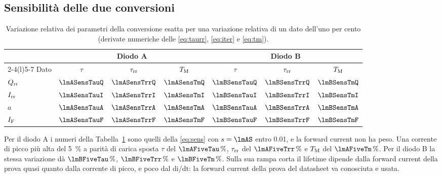 \documentclass[10pt,a4paper]{scrartcl}
\let\newcommand\pdvaluedefine
\newcommand{\IF}{I_\mathrm{F}}
\newcommand{\Irr}{I_\mathrm{rr}}
\newcommand{\Qrr}{Q_\mathrm{rr}}
\newcommand{\taurr}{\tau_\mathrm{rr}}
\newcommand{\TM}{T_\mathrm{M}}
\begin{document}
\subsection{Sensibilità delle due conversioni}
\begin{table}[htb]
\centering\small
\caption{Variazione relativa dei parametri della conversione esatta per una variazione relativa di un dato dell'uno per cento (derivate numeriche delle \eqref{eq:taurr}, \eqref{eq:iter} e \eqref{eq:tm}).}
\label{tab:sensex}
\begin{tabular}{@{}lcccccc@{}}
\toprule
 & \multicolumn{3}{c}{Diodo A} & \multicolumn{3}{c}{Diodo B} \\
\cmidrule(lr){2-4}\cmidrule(l){5-7}
Dato & $\tau$ & $\taurr$ & $\TM$ & $\tau$ & $\taurr$ & $\TM$ \\
\midrule
$\Qrr$ & $\lmASensTauQ$ & $\lmASensTrrQ$ & $\lmASensTmQ$ & $\lmBSensTauQ$ & $\lmBSensTrrQ$ & $\lmBSensTmQ$ \\
$\Irr$ & $\lmASensTauI$ & $\lmASensTrrI$ & $\lmASensTmI$ & $\lmBSensTauI$ & $\lmBSensTrrI$ & $\lmBSensTmI$ \\
$a$ & $\lmASensTauA$ & $\lmASensTrrA$ & $\lmASensTmA$ & $\lmBSensTauA$ & $\lmBSensTrrA$ & $\lmBSensTmA$ \\
$\IF$ & $\lmASensTauF$ & $\lmASensTrrF$ & $\lmASensTmF$ & $\lmBSensTauF$ & $\lmBSensTrrF$ & $\lmBSensTmF$ \\
\bottomrule
\end{tabular}
\end{table}
Per il diodo A i numeri della Tabella~\ref{tab:sensex} sono quelli della \eqref{eq:sens} con $s = \lmAS$ entro \num{0.01}, e la forward current non ha peso. Una corrente di picco più alta del \SI{5}{\percent} a parità di carica sposta $\tau$ del $\lmAFiveTau\,\%$, $\taurr$ del $\lmAFiveTrr\,\%$ e $\TM$ del $\lmAFiveTm\,\%$. Per il diodo B la stessa variazione dà $\lmBFiveTau\,\%$, $\lmBFiveTrr\,\%$ e $\lmBFiveTm\,\%$. Sulla sua rampa corta il lifetime dipende dalla forward current della prova quasi quanto dalla corrente di picco, e poco dal di/dt: la forward current della prova del datasheet va conosciuta e usata.

\end{document}
